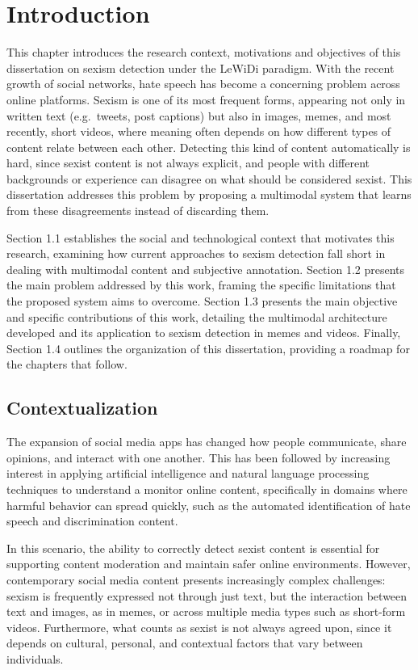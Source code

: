 \chapter{Introduction}\label{cap:intro}

This chapter introduces the research context, motivations and objectives of this dissertation on sexism detection under the LeWiDi paradigm.
With the recent growth of social networks, hate speech has become a concerning problem across online platforms. Sexism is one of its most frequent forms,
appearing not only in written text (e.g.\ tweets, post captions) but also in images, memes, and most recently, short videos, where meaning often depends on 
how different types of content relate between each other. Detecting this kind of content automatically is hard, since sexist content is not always explicit,
and people with different backgrounds or experience can disagree on what should be considered sexist. This dissertation addresses this problem by proposing a multimodal system
that learns from these disagreements instead of discarding them.

Section 1.1 establishes the social and technological context that motivates this research, examining how current approaches to sexism detection fall short in dealing with multimodal content and subjective annotation. 
Section 1.2 presents the main problem addressed by this work, framing the specific limitations that the proposed system aims to overcome. 
Section 1.3 presents the main objective and specific contributions of this work, detailing the multimodal architecture developed and its application to sexism detection in memes and videos. Finally, Section 1.4 outlines the organization of this dissertation, providing a roadmap for the chapters that follow.

\section{Contextualization}\label{sec:contextualization}
The expansion of social media apps has changed how people communicate, share opinions, and interact with one another. This has been followed by increasing interest in applying artificial intelligence and natural language processing
techniques to understand a monitor online content, specifically in domains where harmful behavior can spread quickly, such as the automated identification of hate speech and discrimination content.

In this scenario, the ability to correctly detect sexist content is essential for supporting content moderation and maintain safer online environments. However, contemporary social media content presents increasingly complex challenges:
sexism is frequently expressed not through just text, but the interaction between text and images, as in memes, or across multiple media types such as short-form videos.
Furthermore, what counts as sexist is not always agreed upon, since it depends on cultural, personal, and contextual factors that vary between individuals.

